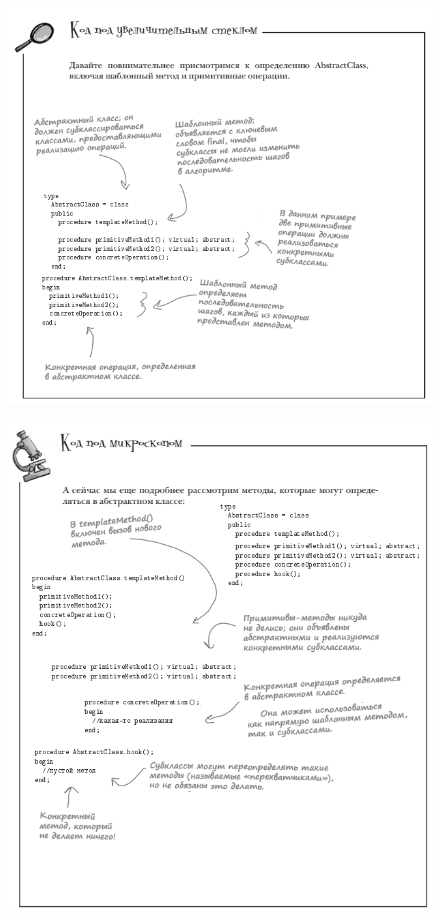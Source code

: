 \documentclass{beamer}
\begin{document}
\begin{frame}
\begin{figure}[h]
\centering
\includegraphics[scale=0.5]{images/lec12-pic15.png}
\label{pic-sort}
\end{figure}
\end{frame}

\begin{frame}
\begin{figure}[h]
\centering
\includegraphics[scale=0.5]{images/lec12-pic16.png}
\label{pic-sort}
\end{figure}
\end{frame}
\end{document}
